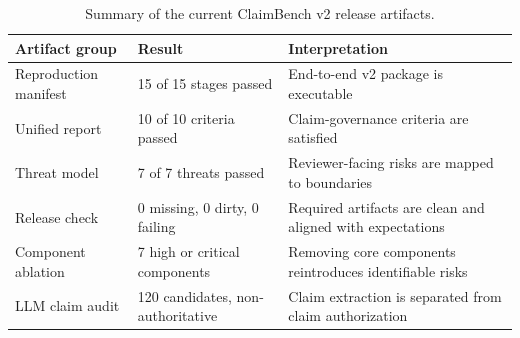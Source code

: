 \begin{table}[t]
\centering
\caption{Summary of the current ClaimBench v2 release artifacts.}
\label{tab:results-summary}
\small
\begin{tabularx}{\textwidth}{p{}p{}X}
\toprule
Artifact group & Result & Interpretation \\
\midrule
Reproduction manifest & 15 of 15 stages passed & End-to-end v2 package is executable \\
Unified report & 10 of 10 criteria passed & Claim-governance criteria are satisfied \\
Threat model & 7 of 7 threats passed & Reviewer-facing risks are mapped to boundaries \\
Release check & 0 missing, 0 dirty, 0 failing & Required artifacts are clean and aligned with expectations \\
Component ablation & 7 high or critical components & Removing core components reintroduces identifiable risks \\
LLM claim audit & 120 candidates, non-authoritative & Claim extraction is separated from claim authorization \\
\bottomrule
\end{tabularx}
\end{table}
